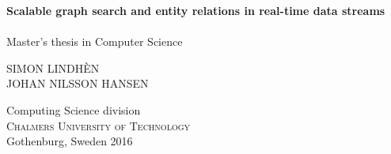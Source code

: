 
\begin{titlepage}
			
\addtolength{\voffset}{2cm}

\mbox{}
\vfill
\renewcommand{\familydefault}{\sfdefault} \normalfont %
\textbf{{\Huge Scalable graph search and entity relations in real-time data streams }} 	\\[0.5cm]
{\Large }\\[0.5cm]
Master's thesis in Computer Science\setlength{\parskip}{1cm}




{\Large SIMON LINDHÈN \\JOHAN NILSSON HANSEN} \setlength{\parskip}{2.9cm}
\vfill
\mbox{}



Computing Science division \\
\textsc{Chalmers University of Technology} \\
Gothenburg, Sweden 2016

\renewcommand{\familydefault}{\rmdefault} \normalfont %
\end{titlepage}


